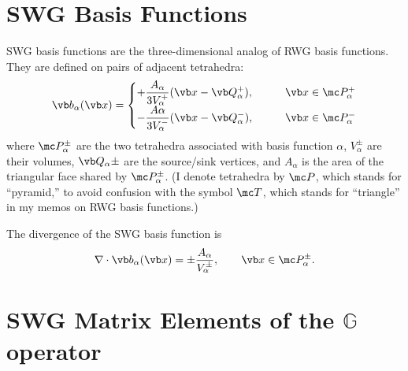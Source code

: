 \documentclass[letterpaper]{article}
\begin{document}

\newpage
\section{SWG Basis Functions}

SWG basis functions are the three-dimensional analog of
RWG basis functions. They are defined on pairs of adjacent tetrahedra:
$$ \vb b_\alpha(\vb x) = 
  \begin{cases}
   \displaystyle{
    +\frac{A_\alpha}{3V_\alpha^+}(\vb x - \vb Q_\alpha^+), 
                }
    \qquad &\vb x\in \mc P_\alpha^+
\\[5pt]
   \displaystyle{
  -\frac{A\alpha}{3V_\alpha^-}(\vb x - \vb Q_\alpha^-), 
                } 
    \qquad &\vb x\in \mc P_\alpha^-
  \end{cases}
$$
where $\mc P_\alpha^\pm$ are the two tetrahedra associated with basis
function $\alpha$, $V_\alpha^\pm$ are their volumes, $\vb Q_\alpha\pm$
are the source/sink vertices, and $A_\alpha$ is the area of the 
triangular face shared by $\mc P_\alpha^\pm$. (I denote tetrahedra 
by $\mc P$, which stands for ``pyramid,'' to avoid confusion with
the symbol $\mc T$, which stands for ``triangle'' in my memos on
RWG basis functions.)

The divergence of the SWG basis function is 
$$ \nabla \cdot \vb b_\alpha(\vb x) = 
    \pm \frac{A_\alpha}{V_\alpha^\pm}, \qquad \vb x\in \mc P_\alpha^\pm.
$$


\newpage
\section{SWG Matrix Elements of the $\mathbb{G}$ operator}

\end{document}
